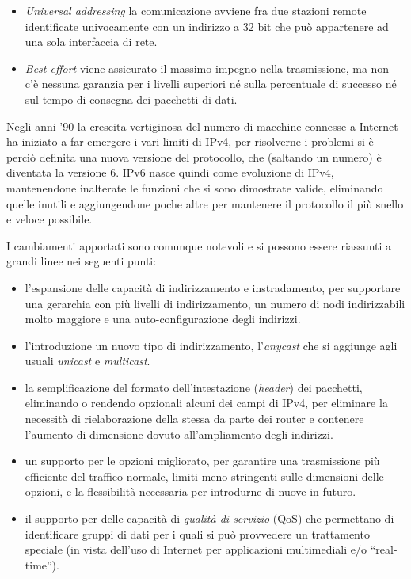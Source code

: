 \begin{itemize}
\item \textit{Universal addressing} la comunicazione avviene fra due stazioni
  remote identificate univocamente con un indirizzo a 32 bit che può
  appartenere ad una sola interfaccia di rete.
\item \textit{Best effort} viene assicurato il massimo impegno nella
  trasmissione, ma non c'è nessuna garanzia per i livelli superiori né sulla
  percentuale di successo né sul tempo di consegna dei pacchetti di dati.
\end{itemize}

Negli anni '90 la crescita vertiginosa del numero di macchine connesse a
Internet ha iniziato a far emergere i vari limiti di IPv4, per risolverne i
problemi si è perciò definita una nuova versione del protocollo, che (saltando
un numero) è diventata la versione 6. IPv6 nasce quindi come evoluzione di
IPv4, mantenendone inalterate le funzioni che si sono dimostrate valide,
eliminando quelle inutili e aggiungendone poche altre per mantenere il
protocollo il più snello e veloce possibile.

I cambiamenti apportati sono comunque notevoli e si possono essere riassunti a
grandi linee nei seguenti punti:
\begin{itemize}
\item l'espansione delle capacità di indirizzamento e instradamento, per
  supportare una gerarchia con più livelli di indirizzamento, un numero di
  nodi indirizzabili molto maggiore e una auto-configurazione degli indirizzi.
\item l'introduzione un nuovo tipo di indirizzamento, l'\textit{anycast} che
  si aggiunge agli usuali \textit{unicast} e \textit{multicast}.
\item la semplificazione del formato dell'intestazione (\textit{header}) dei
  pacchetti, eliminando o rendendo opzionali alcuni dei campi di IPv4, per
  eliminare la necessità di rielaborazione della stessa da parte dei router e
  contenere l'aumento di dimensione dovuto all'ampliamento degli indirizzi.
\item un supporto per le opzioni migliorato, per garantire una trasmissione
  più efficiente del traffico normale, limiti meno stringenti sulle dimensioni
  delle opzioni, e la flessibilità necessaria per introdurne di nuove in
  futuro.
\item il supporto per delle capacità di \textsl{qualità di servizio} (QoS) che
  permettano di identificare gruppi di dati per i quali si può provvedere un
  trattamento speciale (in vista dell'uso di Internet per applicazioni
  multimediali e/o ``real-time'').
\end{itemize}

